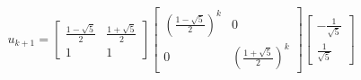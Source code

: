 \documentclass[preview]{standalone}
\begin{document}
\begin{center}
$$u_{k + 1} = \begin{bmatrix} \frac{1 - \sqrt{5}}{2} & \frac{1 + \sqrt{5}}{2} \\ 1 & 1 \end{bmatrix} \begin{bmatrix} \left(\frac{1 - \sqrt{5}}{2}\right)^k &  0 \\ 0 & \left(\frac{1 + \sqrt{5}}{2}\right)^k \end{bmatrix}  \begin{bmatrix} -\frac{1}{\sqrt{5}} \\ \frac{1}{\sqrt{5}} \end{bmatrix}$$
\end{center}
\end{document}
